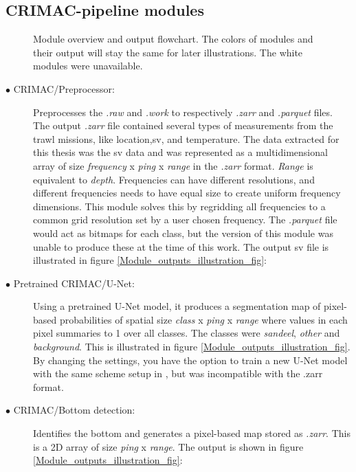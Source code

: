             \subsection{CRIMAC-pipeline modules} \label{CRIMAC-pipeline}
              \begin{figure}[H]
                \centering
                
                \caption[Module overview]{Module overview and output flowchart. The colors of modules and  their output will stay the same for later illustrations. The white modules were unavailable.}
              	\medskip 
                \label{Module_overview_fig}
            \end{figure}

            \begin{description}
              \item[$\bullet$ CRIMAC/Preprocessor:] Preprocesses the \textit{.raw} and \textit{.work} to respectively \textit{.zarr} and \textit{.parquet} files. The output \textit{.zarr} file contained several types of measurements from the trawl missions, like location,\gls{sv}, and temperature. The data extracted for this thesis was the \gls{sv} data and was represented as a multidimensional array of size \textit{frequency} x \textit{ping} x \textit{range} in the  \textit{.zarr} format. \textit{Range} is equivalent to \textit{depth}. Frequencies can have different resolutions, and different frequencies needs to have equal size to create uniform frequency dimensions. This module solves this by regridding all frequencies to a common grid resolution set by a user chosen frequency. The \textit{.parquet} file would act as bitmaps for each class, but the version of this module was unable to produce these at the time of this work. The output \gls{sv} file is illustrated in figure \ref{Module_outputs_illustration_fig}:

              \item[$\bullet$ Pretrained CRIMAC/U-Net:] Using a pretrained U-Net model, it produces a segmentation map of pixel-based probabilities of spatial size \textit{class} x \textit{ping} x \textit{range} where values in each pixel summaries to 1 over all classes. The classes were \textit{sandeel}, \textit{other} and \textit{background}. This is illustrated in figure \ref{Module_outputs_illustration_fig}.  By changing the settings, you have the option to train a new U-Net model with the same scheme setup in \citeauthor{brautaset2020acoustic}, but was incompatible with the .zarr format.
              
              \item[$\bullet$ CRIMAC/Bottom detection:] Identifies the bottom and generates a pixel-based map stored as \textit{.zarr}. This is a 2D array of size \textit{ping} x \textit{range}. The output is shown in figure \ref{Module_outputs_illustration_fig}:

            \end{description}
            

